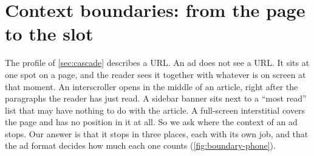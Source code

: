 \section{Context boundaries: from the page to the slot}\label{sec:boundary}

The profile of \cref{sec:cascade} describes a URL. An ad does not see a URL.
It sits at one spot on a page, and the reader sees it together with whatever
is on screen at that moment. An interscroller opens in the middle of an
article, right after the paragraphs the reader has just read. A sidebar banner
sits next to a ``most read'' list that may have nothing to do with the
article. A full-screen interstitial covers the page and has no position in it
at all. So we ask where the context of an ad stops. Our answer is that it
stops in three places, each with its own job, and that the ad format decides
how much each one counts (\cref{fig:boundary-phone}).

